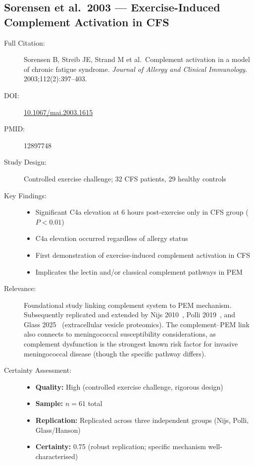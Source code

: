 \subsection{Sorensen et al.\ 2003 --- Exercise-Induced Complement Activation in CFS}

\begin{description}
    \item[Full Citation:] Sorensen B, Streib JE, Strand M et al.\ Complement activation in a model of chronic fatigue syndrome. \textit{Journal of Allergy and Clinical Immunology}. 2003;112(2):397--403.
    \item[DOI:] \href{https://doi.org/10.1067/mai.2003.1615}{10.1067/mai.2003.1615}
    \item[PMID:] 12897748
    \item[Study Design:] Controlled exercise challenge; 32 CFS patients, 29 healthy controls
    \item[Key Findings:]
    \begin{itemize}
        \item Significant C4a elevation at 6 hours post-exercise only in CFS group ($P<0.01$)
        \item C4a elevation occurred regardless of allergy status
        \item First demonstration of exercise-induced complement activation in CFS
        \item Implicates the lectin and/or classical complement pathways in PEM
    \end{itemize}
    \item[Relevance:] Foundational study linking complement system to PEM mechanism. Subsequently replicated and extended by Nijs 2010~\cite{Nijs2010pem}, Polli 2019~\cite{Polli2019complement}, and Glass 2025~\cite{Glass2025ev} (extracellular vesicle proteomics). The complement--PEM link also connects to meningococcal susceptibility considerations, as complement dysfunction is the strongest known risk factor for invasive meningococcal disease (though the specific pathway differs).
    \item[Certainty Assessment:]
    \begin{itemize}
        \item \textbf{Quality:} High (controlled exercise challenge, rigorous design)
        \item \textbf{Sample:} $n=61$ total
        \item \textbf{Replication:} Replicated across three independent groups (Nijs, Polli, Glass/Hanson)
        \item \textbf{Certainty:} 0.75 (robust replication; specific mechanism well-characterised)
    \end{itemize}
\end{description}

